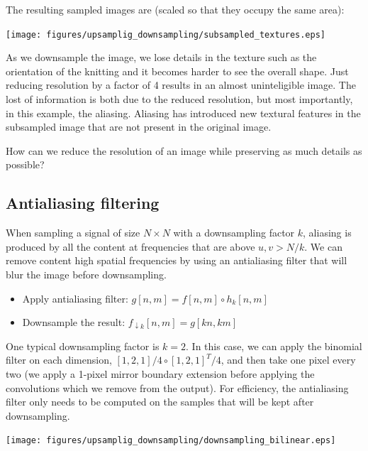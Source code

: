 The resulting sampled images are (scaled so that they occupy the same area):

\begin{center}
\texttt{[image: figures/upsamplig\_downsampling/subsampled\_textures.eps]}
\end{center}

As we downsample the image, we lose details in the texture such as the orientation of the knitting and it becomes harder to see the overall shape. Just reducing resolution by a factor of 4 results in an almost uninteligible image. The lost of information is both due to the reduced resolution, but most importantly, in this example, the aliasing. Aliasing has introduced new textural features in the subsampled image that are not present in the original image. 

How can we reduce the resolution of an image while preserving as much details as possible?


\subsection{Antialiasing filtering}

When sampling a signal of size $N \times N$ with a downsampling factor $k$, aliasing is produced by all the content at frequencies that are above $u,v > N/k$. We can remove content high spatial frequencies by using an antialiasing filter that will blur the image before downsampling.  

\begin{itemize}
\item Apply antialiasing filter: $g \left[ n,m \right] = f \left[n,m\right] \circ h_k \left[ n,m \right]$
\item Downsample the result:  $f_{\downarrow k} \left[n,m\right] = g\left[kn,km\right]$
\end{itemize}

One typical downsampling factor is $k=2$. In this case, we can apply the binomial filter on each dimension, $\left[1,2,1\right]/4 \circ \left[1,2,1\right]^T/4$, and then take one pixel every two (we apply a 1-pixel mirror boundary extension before applying the convolutions which we remove from the output). For efficiency, the antialiasing filter only needs to be computed on the samples that will be kept after downsampling. 




\begin{center}
\texttt{[image: figures/upsamplig\_downsampling/downsampling\_bilinear.eps]}
\end{center}


